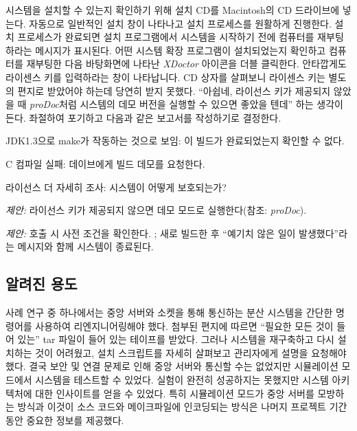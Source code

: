 \documentclass[a4paper,10pt,twoside]{book}
\begin{document}
시스템을 설치할 수 있는지 확인하기 위해 설치 CD를 Macintosh의 CD 드라이브에 넣는다. 자동으로 일반적인 설치 창이 나타나고 설치 프로세스를 원활하게 진행한다. 설치 프로세스가 완료되면 설치 프로그램에서 시스템을 시작하기 전에 컴퓨터를 재부팅하라는 메시지가 표시된다. 어떤 시스템 확장 프로그램이 설치되었는지 확인하고 컴퓨터를 재부팅한 다음 바탕화면에 나타난 \emph{XDoctor} 아이콘을 더블 클릭한다. 안타깝게도 라이센스 키를 입력하라는 창이 나타납니다. CD 상자를 살펴보니 라이센스 키는 별도의 편지로 받았어야 하는데 당연히 받지 못했다. ``아쉽네, 라이선스 키가 제공되지 않았을 때 \emph{proDoc}처럼 시스템의 데모 버전을 실행할 수 있으면 좋았을 텐데'' 하는 생각이 든다. 좌절하여 포기하고 다음과 같은 보고서를 작성하기로 결정한다.

\begin{bulletlist}
  \item JDK1.3으로 make가 작동하는 것으로 보임: 이 빌드가 완료되었는지 확인할 수 없다.

  \item C 컴파일 실패: 데이브에게 빌드 데모를 요청한다.

  \item 라이선스 더 자세히 조사: 시스템이 어떻게 보호되는가?

  \item \emph{제안:}
라이선스 키가 제공되지 않으면 데모 모드로 실행한다(참조: \emph{proDoc}).

  \item \emph{제안:}
호출 시 사전 조건을 확인한다. ; 새로 빌드한 후 ``예기치 않은 일이 발생했다''라는 메시지와 함께 시스템이 종료된다.
\end{bulletlist}

\subsection*{알려진 용도}

 사례 연구 중 하나에서는 중앙 서버와 소켓을 통해 통신하는 분산 시스템을 간단한 명령어를 사용하여 리엔지니어링해야 했다. 첨부된 편지에 따르면 ``필요한 모든 것이 들어 있는'' tar 파일이 들어 있는 테이프를 받았다. 그러나 시스템을 재구축하고 다시 설치하는 것이 어려웠고, 설치 스크립트를 자세히 살펴보고 관리자에게 설명을 요청해야 했다. 결국 보안 및 연결 문제로 인해 중앙 서버와 통신할 수는 없었지만 시뮬레이션 모드에서 시스템을 테스트할 수 있었다. 실험이 완전히 성공하지는 못했지만 시스템 아키텍처에 대한 인사이트를 얻을 수 있었다. 특히 시뮬레이션 모드가 중앙 서버를 모방하는 방식과 이것이 소스 코드와 메이크파일에 인코딩되는 방식은 나머지 프로젝트 기간 동안 중요한 정보를 제공했다.
\end{document}
